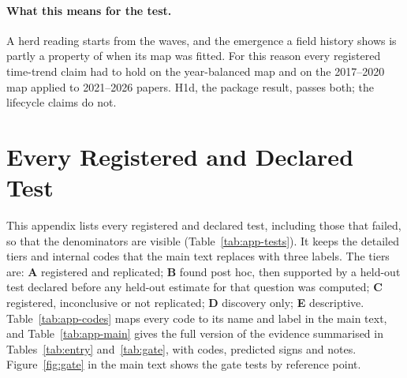 \paragraph{What this means for the test.} A herd reading starts from the waves, and the emergence a field history shows
is partly a property of when its map was fitted. For this reason every registered time-trend claim had to hold on
the year-balanced map and on the 2017--2020 map applied to 2021--2026 papers. H1d, the package result, passes both;
the lifecycle claims do not.

\FloatBarrier
\section{Every Registered and Declared Test}\label{app:tests}

This appendix lists every registered and declared test, including those that failed, so that the denominators are
visible (Table~\ref{tab:app-tests}). It keeps the detailed tiers and internal codes that the main text replaces with
three labels. The tiers are: \textbf{A} registered and replicated; \textbf{B} found post hoc, then supported by a
held-out test declared before any held-out estimate for that question was computed; \textbf{C} registered, inconclusive or not replicated;
\textbf{D} discovery only; \textbf{E} descriptive. Table~\ref{tab:app-codes} maps every code to its name and label in
the main text, and Table~\ref{tab:app-main} gives the full version of the evidence summarised in
Tables~\ref{tab:entry} and~\ref{tab:gate}, with codes, predicted signs and notes. Figure~\ref{fig:gate} in the main
text shows the gate tests by reference point.

